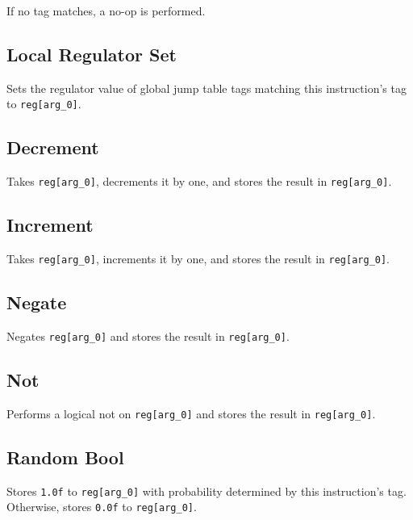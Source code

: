 If no tag matches, a no-op is performed.

\subsection{Local Regulator Set}


Sets the regulator value of global jump table tags matching this instruction's tag to \texttt{reg[arg\_0]}.

\subsection{Decrement}


Takes \texttt{reg[arg\_0]}, decrements it by one, and stores the result in \texttt{reg[arg\_0]}.

\subsection{Increment}


Takes \texttt{reg[arg\_0]}, increments it by one, and stores the result in \texttt{reg[arg\_0]}.

\subsection{Negate}


Negates \texttt{reg[arg\_0]} and stores the result in \texttt{reg[arg\_0]}.

\subsection{Not}


Performs a logical not on \texttt{reg[arg\_0]} and stores the result in \texttt{reg[arg\_0]}.

\subsection{Random Bool}


Stores \texttt{1.0f} to \texttt{reg[arg\_0]} with probability determined by this instruction's tag.
Otherwise, stores \texttt{0.0f} to \texttt{reg[arg\_0]}.

